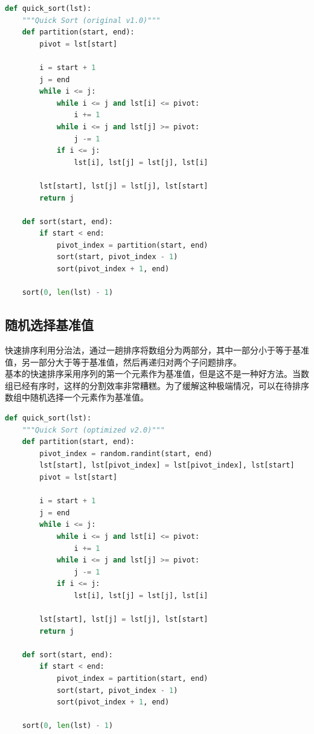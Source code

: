 
\begin{lstlisting}[language=Python]
def quick_sort(lst):
    """Quick Sort (original v1.0)"""
    def partition(start, end):
        pivot = lst[start]

        i = start + 1
        j = end
        while i <= j:
            while i <= j and lst[i] <= pivot:
                i += 1
            while i <= j and lst[j] >= pivot:
                j -= 1
            if i <= j:
                lst[i], lst[j] = lst[j], lst[i]

        lst[start], lst[j] = lst[j], lst[start]
        return j

    def sort(start, end):
        if start < end:
            pivot_index = partition(start, end)
            sort(start, pivot_index - 1)
            sort(pivot_index + 1, end)

    sort(0, len(lst) - 1)
\end{lstlisting}

\vspace{0.5cm}

\subsection{随机选择基准值}

快速排序利用分治法，通过一趟排序将数组分为两部分，其中一部分小于等于基准值，另一部分大于等于基准值，然后再递归对两个子问题排序。\\

基本的快速排序采用序列的第一个元素作为基准值，但是这不是一种好方法。当数组已经有序时，这样的分割效率非常糟糕。为了缓解这种极端情况，可以在待排序数组中随机选择一个元素作为基准值。\\


\begin{lstlisting}[language=Python]
def quick_sort(lst):
    """Quick Sort (optimized v2.0)"""
    def partition(start, end):
        pivot_index = random.randint(start, end)
        lst[start], lst[pivot_index] = lst[pivot_index], lst[start]
        pivot = lst[start]

        i = start + 1
        j = end
        while i <= j:
            while i <= j and lst[i] <= pivot:
                i += 1
            while i <= j and lst[j] >= pivot:
                j -= 1
            if i <= j:
                lst[i], lst[j] = lst[j], lst[i]
        
        lst[start], lst[j] = lst[j], lst[start]
        return j

    def sort(start, end):
        if start < end:
            pivot_index = partition(start, end)
            sort(start, pivot_index - 1)
            sort(pivot_index + 1, end)

    sort(0, len(lst) - 1)
\end{lstlisting}

